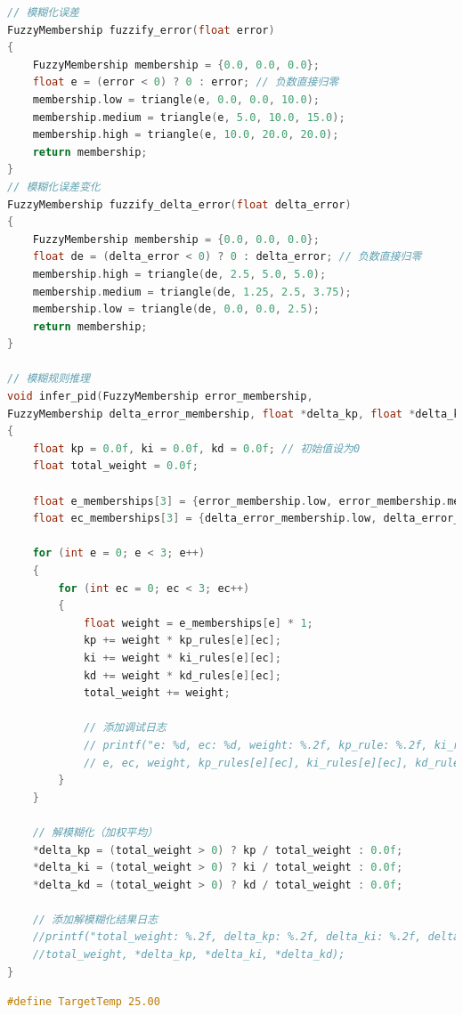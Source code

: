 \documentclass[UTF8]{ctexart}
\begin{document}
\begin{appendices}
\begin{lstlisting}[language=C, caption=TMF.c]
// 模糊化误差
FuzzyMembership fuzzify_error(float error)
{
	FuzzyMembership membership = {0.0, 0.0, 0.0};
	float e = (error < 0) ? 0 : error; // 负数直接归零
	membership.low = triangle(e, 0.0, 0.0, 10.0);
	membership.medium = triangle(e, 5.0, 10.0, 15.0);
	membership.high = triangle(e, 10.0, 20.0, 20.0);
	return membership;
}
// 模糊化误差变化
FuzzyMembership fuzzify_delta_error(float delta_error)
{
	FuzzyMembership membership = {0.0, 0.0, 0.0};
	float de = (delta_error < 0) ? 0 : delta_error; // 负数直接归零
	membership.high = triangle(de, 2.5, 5.0, 5.0);
	membership.medium = triangle(de, 1.25, 2.5, 3.75);
	membership.low = triangle(de, 0.0, 0.0, 2.5);
	return membership;
}

// 模糊规则推理
void infer_pid(FuzzyMembership error_membership, 
FuzzyMembership delta_error_membership, float *delta_kp, float *delta_ki, float *delta_kd)
{
	float kp = 0.0f, ki = 0.0f, kd = 0.0f; // 初始值设为0
	float total_weight = 0.0f;
	
	float e_memberships[3] = {error_membership.low, error_membership.medium, error_membership.high};
	float ec_memberships[3] = {delta_error_membership.low, delta_error_membership.medium, delta_error_membership.high};
	
	for (int e = 0; e < 3; e++)
	{
		for (int ec = 0; ec < 3; ec++)
		{
			float weight = e_memberships[e] * 1;
			kp += weight * kp_rules[e][ec];
			ki += weight * ki_rules[e][ec];
			kd += weight * kd_rules[e][ec];
			total_weight += weight;
			
			// 添加调试日志
			// printf("e: %d, ec: %d, weight: %.2f, kp_rule: %.2f, ki_rule: %.2f, kd_rule: %.2f\n", 
			// e, ec, weight, kp_rules[e][ec], ki_rules[e][ec], kd_rules[e][ec]);
		}
	}
	
	// 解模糊化（加权平均）
	*delta_kp = (total_weight > 0) ? kp / total_weight : 0.0f;
	*delta_ki = (total_weight > 0) ? ki / total_weight : 0.0f;
	*delta_kd = (total_weight > 0) ? kd / total_weight : 0.0f;
	
	// 添加解模糊化结果日志
	//printf("total_weight: %.2f, delta_kp: %.2f, delta_ki: %.2f, delta_kd: %.2f\n", 
	//total_weight, *delta_kp, *delta_ki, *delta_kd);
}
\end{lstlisting}
\begin{lstlisting}[language=C, caption=TMF.h]
#define TargetTemp 25.00


\end{lstlisting}
\end{appendices}
\end{document}
